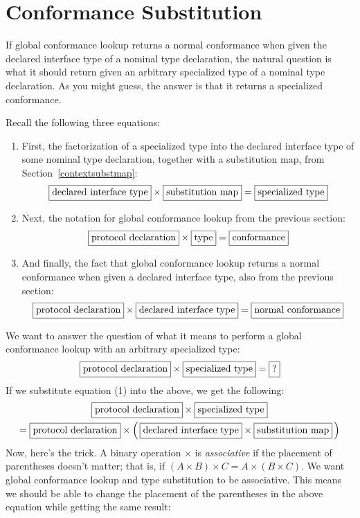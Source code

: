 \documentclass[a4paper,headsepline,bibliography=totoc,toc=flat,fleqn,twoside=semi]{scrbook}
\theoremstyle{definition}
\theoremstyle{definition}
\theoremstyle{definition}
\newcommand{\mathboxed}[1]{\boxed{\mbox{\vphantom{pI\texttt{pI}}#1}}}
\begin{document}
\section{Conformance Substitution}\label{conformance subst}

If global conformance lookup returns a normal conformance when given the declared interface type of a nominal type declaration, the natural question is what it should return given an arbitrary specialized type of a nominal type declaration. As you might guess, the answer is that it returns a specialized conformance.

Recall the following three equations:
\begin{enumerate}
\item First, the factorization of a specialized type into the declared interface type of some nominal type declaration, together with a substitution map, from Section~\ref{contextsubstmap}:
\[\mathboxed{declared interface type} \times \mathboxed{substitution map} = \mathboxed{specialized type}\]
\item Next, the notation for global conformance lookup from the previous section:
\[\mathboxed{protocol declaration} \times \mathboxed{type} = \mathboxed{conformance}\]
\item And finally, the fact that global conformance lookup returns a normal conformance when given a declared interface type, also from the previous section:
\[\mathboxed{protocol declaration} \times \mathboxed{declared interface type} = \mathboxed{normal conformance}\]
\end{enumerate}
We want to answer the question of what it means to perform a global conformance lookup with an arbitrary specialized type:
\[
\mathboxed{protocol declaration} \times \mathboxed{specialized type} = \mathboxed{?}
\]
If we substitute equation (1) into the above, we get the following:
\begin{gather*}
\mathboxed{protocol declaration} \times \mathboxed{specialized type}\\
= \mathboxed{protocol declaration} \times \left(\,\mathboxed{declared interface type} \times \mathboxed{substitution map}\,\right)
\end{gather*}
Now, here's the trick. A binary operation $\times$ is \emph{associative} if the placement of parentheses doesn't matter; that is, if $(A\times B)\times C=A\times (B\times C)$. We want global conformance lookup and type substitution to be associative. This means we should be able to change the placement of the parentheses in the above equation while getting the same result:
\end{document}
